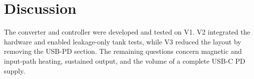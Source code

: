 \chapter{Discussion}
\label{ch:discussion}

The converter and controller were developed and tested on V1. V2 integrated the hardware
and enabled leakage-only tank tests, while V3 reduced the layout by
removing the USB-PD section. The remaining questions concern magnetic and
input-path heating, sustained output, and the volume of a complete USB-C PD supply.











